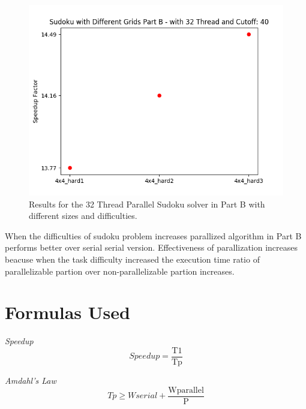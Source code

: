 \documentclass{article}
\newcommand\tab[1][0.5cm]{\hspace*{#1}}
\begin{document}
\begin{figure}[!htb]
    \centering
    \includegraphics[width=1\linewidth]{./img/grids_part_2_B.png}
    \caption{Results for the 32 Thread Parallel Sudoku solver in Part B with different sizes and difficulties.}
\end{figure}
\tab When the difficulties of sudoku problem increases parallized algorithm in Part B performs better 
over serial serial version. Effectiveness of parallization increases beacuse when the task difficulty
increased the execution time ratio of parallelizable partion over non-parallelizable partion increases. 


\section{Formulas Used}

\begin{enumerate}
\begin{item}
    \emph{Speedup} 
    \begin{equation*}
    Speedup  = \frac{\mathrm{T1}}{\mathrm{Tp}}
    \end{equation*}
\end{item}
\begin{item}
    \emph{Amdahl's Law} 
    \begin{equation*}
    Tp \geq Wserial + \frac{\mathrm{Wparallel}}{\mathrm{P}}
    \end{equation*}
\end{item}
\end{enumerate}
\end{document}
